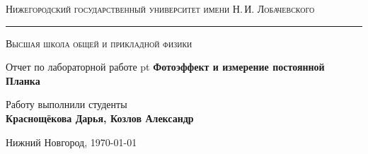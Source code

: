 \begin{titlepage}
	\begin{center}
	{\small\textsc{Нижегородский государственный университет имени Н.\,И. Лобачевского}}
	\vskip 2pt \hrule \vskip 3pt
	{\small\textsc{Высшая школа общей и прикладной физики}}

	\vfill


	{{\large Отчет по лабораторной работе} pt {\Large \bfseries Фотоэффект и измерение постоянной Планка}}

		
	\vspace{2cm}
	{\large Работу выполнили студенты \\[0.5em]{\Large \bfseries Краснощёкова Дарья, Козлов Александр}}

	\end{center}

	\vfill

	\begin{center}
	{Нижний Новгород, \today}
	\end{center}
\end{titlepage}